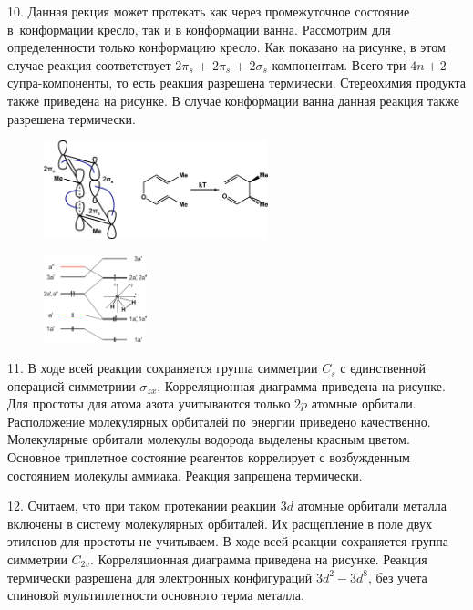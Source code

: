 10. Данная рекция может протекать как через промежуточное состояние в~конформации кресло, так и в конформации ванна. Рассмотрим для определенности только конформацию кресло. Как показано на рисунке, в этом случае реакция соответствует $2\pi_s$ + $2\pi_s$ + $2\sigma_s$ компонентам. Всего три $4n+2$ супра-компоненты, то есть реакция разрешена термически. Стереохимия продукта также приведена на рисунке. В случае конформации ванна данная реакция также разрешена термически.\par
\vspace{-\parskip}
\vspace{1mm}
\begin{figure}[h]
\includegraphics[width=6.5cm]{images/Fig_2_1_10_dec.png}
\centering
\end{figure}
\par
\vspace{-\parskip}
\begin{figure} %
    \centering
    \vspace{4mm}
    \includegraphics[width=30mm]{images/Fig_2_1_11_dec.png}
    \vspace{-5mm}
\end{figure}
11. В ходе всей реакции сохраняется группа симметрии $C_s$ с единственной операцией симметриии $\sigma_{zx}$. Корреляционная диаграмма приведена на рисунке. Для простоты для атома азота учитываются только $2p$ атомные орбитали. Расположение молекулярных орбиталей по~энергии приведено качественно. Молекулярные орбитали молекулы водорода выделены красным цветом. Основное триплетное состояние реагентов коррелирует с возбужденным состоянием молекулы аммиака. Реакция запрещена термически.\par
12. Считаем, что при таком протекании реакции $3d$ атомные орбитали металла включены в систему молекулярных орбиталей. Их расщепление в поле двух этиленов для простоты не учитываем. В ходе всей реакции сохраняется группа симметрии $C_{2v}$. Корреляционная диаграмма приведена на рисунке. Реакция термически разрешена для электронных конфигураций $3d^2-3d^8$, без учета спиновой мультиплетности основного терма металла.\par
